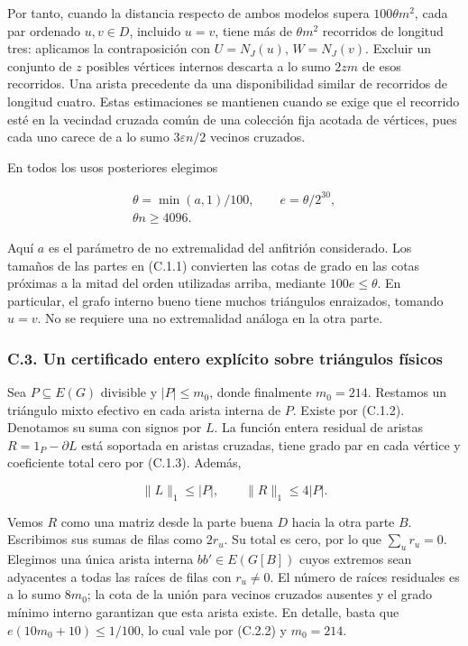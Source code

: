 \documentclass[spanish,11pt,a4paper]{article}
\begin{document}
Por tanto, cuando la distancia respecto de ambos modelos supera \(100\theta m^2\), cada par ordenado \(u,v\in D\), incluido \(u=v\), tiene más de \(\theta m^2\) recorridos de longitud tres: aplicamos la contraposición con \(U=N_J(u)\), \(W=N_J(v)\). Excluir un conjunto de \(z\) posibles vértices internos descarta a lo sumo \(2zm\) de esos recorridos. Una arista precedente da una disponibilidad similar de recorridos de longitud cuatro. Estas estimaciones se mantienen cuando se exige que el recorrido esté en la vecindad cruzada común de una colección fija acotada de vértices, pues cada uno carece de a lo sumo \(3\varepsilon n/2\) vecinos cruzados.

En todos los usos posteriores elegimos

\[\begin{gathered}
\theta=\min(a,1)/100,\qquad e=\theta/2^{30},\\
\theta n\ge4096.
\end{gathered}
\tag{C.2.2}\]

Aquí \(a\) es el parámetro de no extremalidad del anfitrión considerado. Los tamaños de las partes en (C.1.1) convierten las cotas de grado en las cotas próximas a la mitad del orden utilizadas arriba, mediante \(100e\le\theta\). En particular, el grafo interno bueno tiene muchos triángulos enraizados, tomando \(u=v\). No se requiere una no extremalidad análoga en la otra parte.

\subsubsection{C.3. Un certificado entero explícito sobre triángulos físicos}\label{c.3.-un-certificado-entero-expluxedcito-sobre-triuxe1ngulos-fuxedsicos}

Sea \(P\subseteq E(G)\) divisible y \(|P|\le m_0\), donde finalmente \(m_0=214\). Restamos un triángulo mixto efectivo en cada arista interna de \(P\). Existe por (C.1.2). Denotamos su suma con signos por \(L\). La función entera residual de aristas \(R=1_P-\partial L\) está soportada en aristas cruzadas, tiene grado par en cada vértice y coeficiente total cero por (C.1.3). Además,

\[\|L\|_1\le |P|,\qquad\|R\|_1\le4|P|.
\tag{C.3.1}\]

Vemos \(R\) como una matriz desde la parte buena \(D\) hacia la otra parte \(B\). Escribimos sus sumas de filas como \(2r_u\). Su total es cero, por lo que \(\sum_u r_u=0\). Elegimos una única arista interna \(bb'\in E(G[B])\) cuyos extremos sean adyacentes a todas las raíces de filas con \(r_u\ne0\). El número de raíces residuales es a lo sumo \(8m_0\); la cota de la unión para vecinos cruzados ausentes y el grado mínimo interno garantizan que esta arista existe. En detalle, basta que \(e(10m_0+10)\le1/100\), lo cual vale por (C.2.2) y \(m_0=214\).
\end{document}
